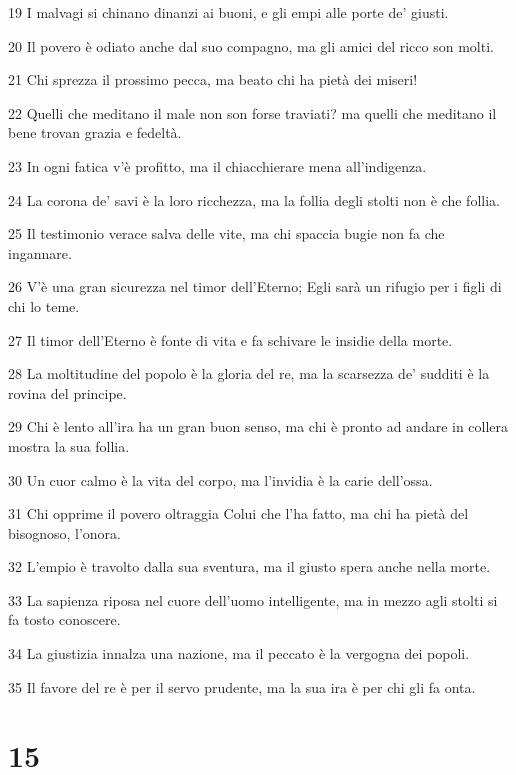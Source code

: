 \par 19 I malvagi si chinano dinanzi ai buoni, e gli empi alle porte de' giusti.
\par 20 Il povero è odiato anche dal suo compagno, ma gli amici del ricco son molti.
\par 21 Chi sprezza il prossimo pecca, ma beato chi ha pietà dei miseri!
\par 22 Quelli che meditano il male non son forse traviati? ma quelli che meditano il bene trovan grazia e fedeltà.
\par 23 In ogni fatica v'è profitto, ma il chiacchierare mena all'indigenza.
\par 24 La corona de' savi è la loro ricchezza, ma la follia degli stolti non è che follia.
\par 25 Il testimonio verace salva delle vite, ma chi spaccia bugie non fa che ingannare.
\par 26 V'è una gran sicurezza nel timor dell'Eterno; Egli sarà un rifugio per i figli di chi lo teme.
\par 27 Il timor dell'Eterno è fonte di vita e fa schivare le insidie della morte.
\par 28 La moltitudine del popolo è la gloria del re, ma la scarsezza de' sudditi è la rovina del principe.
\par 29 Chi è lento all'ira ha un gran buon senso, ma chi è pronto ad andare in collera mostra la sua follia.
\par 30 Un cuor calmo è la vita del corpo, ma l'invidia è la carie dell'ossa.
\par 31 Chi opprime il povero oltraggia Colui che l'ha fatto, ma chi ha pietà del bisognoso, l'onora.
\par 32 L'empio è travolto dalla sua sventura, ma il giusto spera anche nella morte.
\par 33 La sapienza riposa nel cuore dell'uomo intelligente, ma in mezzo agli stolti si fa tosto conoscere.
\par 34 La giustizia innalza una nazione, ma il peccato è la vergogna dei popoli.
\par 35 Il favore del re è per il servo prudente, ma la sua ira è per chi gli fa onta.

\chapter{15}

